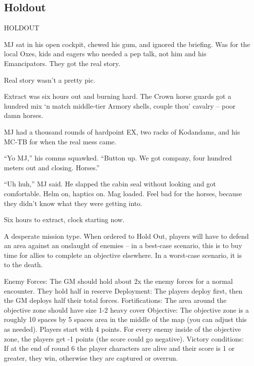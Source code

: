                                                                                                           
\subsection{Holdout}

HOLDOUT  

          MJ sat in his open cockpit, chewed his gum, and ignored the briefing. Was for the local Oxes, kids  
          and eagers who needed a pep talk, not him and his Emancipators. They got the real story.   

          Real story wasn’t a pretty pic.     

          Extract was six hours out and burning hard. The Crown horse guards got a hundred mix ‘n match  
          middle-tier Armory shells, couple thou’ cavalry -- poor damn horses.   

          MJ had a thousand rounds of hardpoint EX, two racks of Kodandams, and his MC-TB for when the  
          real mess came.  

          “Yo MJ,” his comms squawked. “Button up. We got company, four hundred meters out and closing.  
          Horses.”   

          “Uh huh,” MJ said. He slapped the cabin seal without looking and got comfortable. Helm on, haptics  
          on. Mag loaded. Feel bad for the horses, because they didn’t know what they were getting into.   

          Six hours to extract, clock starting now.     

A desperate mission type. When ordered to Hold Out, players will have to defend an area against  
an onslaught of enemies -- in a best-case scenario, this is to buy time for allies to complete an  
objective elsewhere. In a worst-case scenario, it is to the death.   

                                                                                                                               


Enemy Forces: The GM should hold about 2x the enemy forces for a normal encounter. They  
hold half in reserve  
Deployment: The players deploy first, then the GM deploys half their total forces.  
Fortifications: The area around the objective zone should have size 1-2 heavy cover  
Objective: The objective zone is a roughly 10 spaces by 5 spaces area in the middle of the map  
(you can adjust this as needed). Players start with 4 points. For every enemy inside of the  
objective zone, the players get -1 points (the score could go negative).  
Victory conditions:  If at the end of round 6 the player characters are alive and their score is 1 or  
greater, they win, otherwise they are captured or overrun.  

